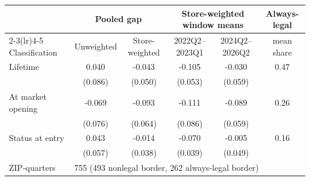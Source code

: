 \begin{tabular}{lccccc}
\toprule
 & \multicolumn{2}{c}{Pooled gap} & \multicolumn{2}{c}{Store-weighted window means} & Always-legal \\
\cmidrule(lr){2-3}\cmidrule(lr){4-5}
Classification & Unweighted & Store-weighted & 2022Q2--2023Q1 & 2024Q2--2026Q2 & mean share \\
\midrule
Lifetime & 0.040 & -0.043 & -0.105 & -0.030 & 0.47 \\
 & (0.086) & (0.050) & (0.053) & (0.059) & \\[2pt]
At market opening & -0.069 & -0.093 & -0.111 & -0.089 & 0.26 \\
 & (0.076) & (0.064) & (0.086) & (0.059) & \\[2pt]
Status at entry & 0.043 & -0.014 & -0.070 & -0.005 & 0.16 \\
 & (0.057) & (0.038) & (0.039) & (0.049) & \\[2pt]
\midrule
ZIP-quarters & \multicolumn{5}{l}{755 (493 nonlegal border, 262 always-legal border)} \\
\bottomrule
\end{tabular}
